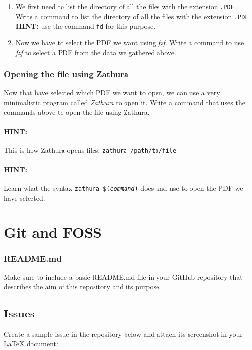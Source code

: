 \documentclass[12pt]{article}
\begin{document}
	\begin{enumerate}
		\item We first need to list the directory of all the files with the extension \texttt{.PDF}. Write a command to list the directory of all the files with the extension \texttt{.PDF} \\
		\textbf{HINT:} use the command \texttt{fd} for this purpose.
		\item Now we have to select the PDF we want using \textit{fzf}. Write a command to use \textit{fzf} to select a PDF from the data we gathered above.
	\end{enumerate}
	
	\subsubsection{Opening the file using Zathura}
	Now that have selected which PDF we want to open, we can use a very minimalistic program called \textit{Zathura} to open it. Write a command that uses the
	commands above to open the file using Zathura.
	\paragraph{HINT:} This is how Zathura opens files: \texttt{zathura /path/to/file}
	\paragraph{HINT:} Learn what the syntax \texttt{zathura \$(\textit{command})} does and use to open the PDF we have selected.
	
	\section{Git and FOSS}
	\subsubsection{README.md}
	Make sure to include a basic README.md file in your GitHub repository that describes the aim of this repository and its purpose.
	
	\subsection{Issues}
	Create a sample issue in the repository below and attach its screenshot in your LaTeX document:
	
	\url{}
	
	\pagebreak
	
\end{document}
